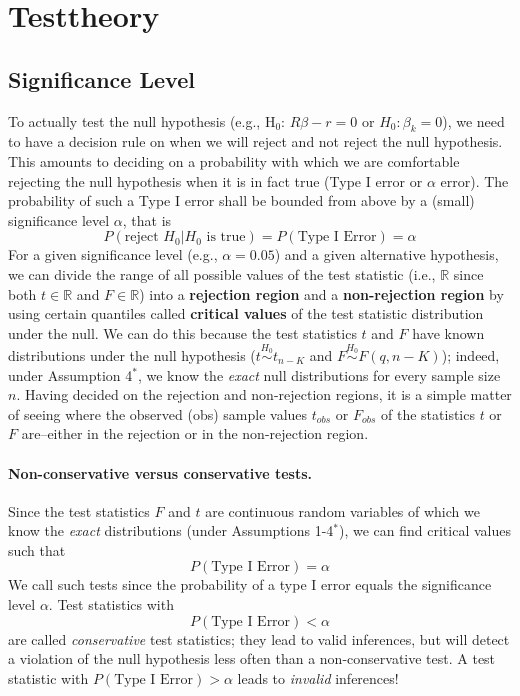 \documentclass[
  14pt,
]{memoir}
\begin{document}
\hypertarget{testtheory}{%
\section{Testtheory}\label{testtheory}}

\hypertarget{significance-level}{%
\subsection{Significance Level}\label{significance-level}}

To actually test the null hypothesis (e.g., H\(_0\): \(R\beta-r=0\) or \(H_0:\beta_k=0\)), we need to have a decision rule on when we will reject and not reject the null hypothesis. This amounts to deciding on a probability with which we are comfortable rejecting the null hypothesis when it is in fact true (Type I error or \(\alpha\) error). The probability of such a Type I error shall be bounded from above by a (small) significance level \(\alpha\), that is
\[
P(\text{reject } H_0| H_0\text{ is true})=P(\text{Type I Error})=\alpha
\]
For a given significance level (e.g., \(\alpha=0.05\)) and a given alternative hypothesis, we can divide the range of all possible values of the test statistic (i.e., \(\mathbb{R}\) since both \(t\in\mathbb{R}\) and \(F\in\mathbb{R}\)) into a \textbf{rejection region} and a \textbf{non-rejection region} by using certain quantiles called \textbf{critical values} of the test statistic distribution under the null. We can do this because the test statistics \(t\) and \(F\) have known distributions under the null hypothesis (\(t\overset{H_0}{\sim}t_{n-K}\) and \(F\overset{H_0}{\sim}F(q,n-K)\)); indeed, under Assumption 4\(^\ast\), we know the \emph{exact} null distributions for every sample size \(n\). Having decided on the rejection and non-rejection regions, it is a simple matter of seeing where the observed (obs) sample values \(t_{obs}\) or \(F_{obs}\) of the statistics \(t\) or \(F\) are--either in the rejection or in the non-rejection region.

\paragraph*{Non-conservative versus conservative tests.}

Since the test statistics \(F\) and \(t\) are continuous random variables of which we know the \emph{exact} distributions (under Assumptions 1-4\(^\ast\)), we can find critical values such that
\[
P(\text{Type I Error})=\alpha
\]
We call such tests  since the probability of a type I error equals the significance level \(\alpha\). Test statistics with
\[
P(\text{Type I Error})<\alpha
\]
are called \emph{conservative} test statistics; they lead to valid inferences, but will detect a violation of the null hypothesis less often than a non-conservative test. A test statistic with \(P(\text{Type I Error})>\alpha\) leads to \emph{invalid} inferences!
\end{document}
